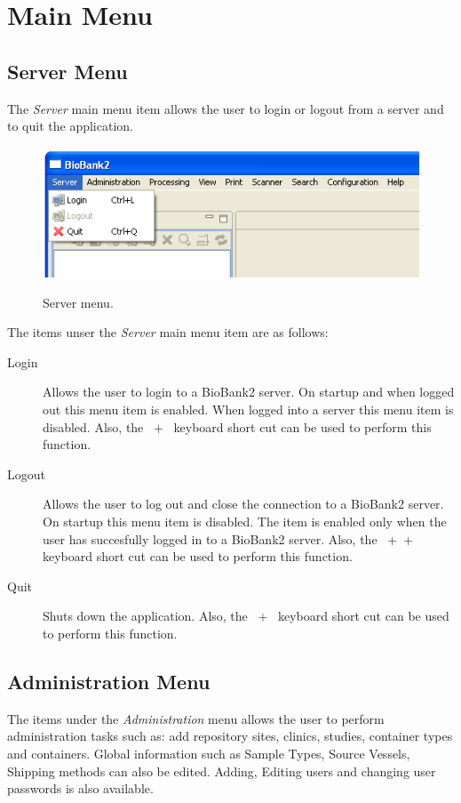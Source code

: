 \section{Main Menu}
\label{sec:main_menu}

\subsection{Server Menu}
The \emph{Server} main menu item allows the user to login or logout from a
server and to quit the application.
    \begin{figure}[H]
      \centering
      \scalebox{0.5}
      { \includegraphics*{screenshots/overview/main_menu_server} }
      \caption{Server menu.}
      \label{fig:main_menu_server}
    \end{figure}
The items unser the \emph{Server} main menu item are as follows:
\begin{description}
  \item[Login] Allows the user to login to a BioBank2 server. On startup and
    when logged out this menu item is enabled. When logged into a server this
    menu item is disabled. Also, the \mbox{ + } keyboard
    short cut can be used to perform this function.
  \item[Logout] Allows the user to log out and close the connection to a
    BioBank2 server. On startup this menu item is disabled. The item is enabled
    only when the user has succesfully logged in to a BioBank2 server. Also,
    the \mbox{ +  + } keyboard short cut can be
    used to perform this function.
  \item[Quit] Shuts down the application. Also, the \mbox{ +
    } keyboard short cut can be used to perform this function.
\end{description}

\subsection{Administration Menu}
The items under the \emph{Administration} menu allows the user to perform
administration tasks such as: add repository sites, clinics, studies, container
types and containers. Global information such as Sample Types, Source Vessels,
Shipping methods can also be edited. Adding, Editing users and changing user
passwords is also available.


